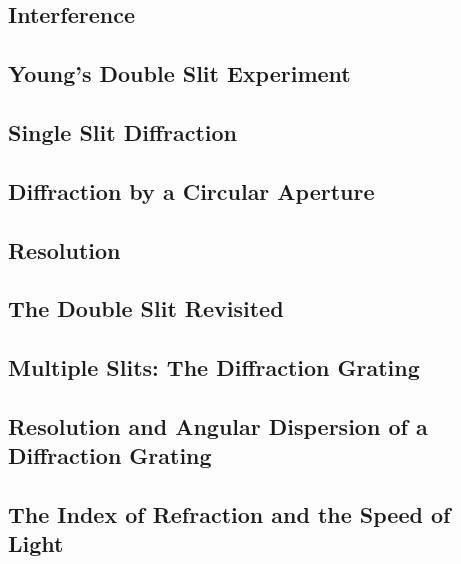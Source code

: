 \documentclass[twocolumn]{article}
\begin{document}
\subsection{Interference}
\begin{outline}
\1 
\end{outline}
\subsection{Young's Double Slit Experiment}
\begin{outline}
\1 
\end{outline}
\subsection{Single Slit Diffraction}
\begin{outline}
\1 
\end{outline}
\subsection{Diffraction by a Circular Aperture}
\begin{outline}
\1 
\end{outline}
\subsection{Resolution}
\begin{outline}
\1 
\end{outline}
\subsection{The Double Slit Revisited}
\begin{outline}
\1 
\end{outline}
\subsection{Multiple Slits: The Diffraction Grating}
\begin{outline}
\1 
\end{outline}
\subsection{Resolution and Angular Dispersion of a Diffraction Grating}
\begin{outline}
\1 
\end{outline}
\subsection{The Index of Refraction and the Speed of Light}
\begin{outline}
\1 
\end{outline}
\end{document}
